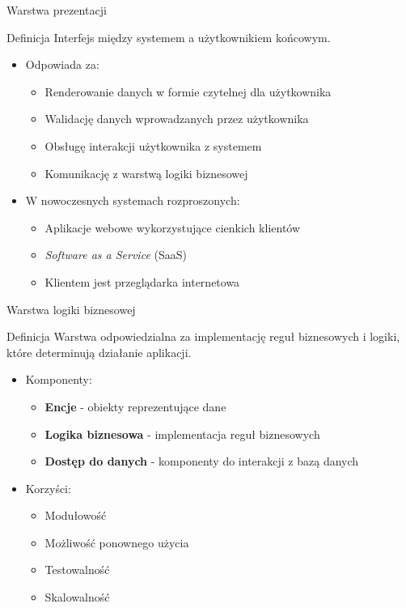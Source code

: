 \documentclass[aspectratio=169]{beamer}
\begin{document}
\begin{frame}{Warstwa prezentacji}
    \begin{block}{Definicja}
        Interfejs między systemem a użytkownikiem końcowym.
    \end{block}
    
    \begin{itemize}
        \item Odpowiada za:
        \begin{itemize}
            \item Renderowanie danych w formie czytelnej dla użytkownika
            \item Walidację danych wprowadzanych przez użytkownika
            \item Obsługę interakcji użytkownika z systemem
            \item Komunikację z warstwą logiki biznesowej
        \end{itemize}
        \vspace{0.3cm}
        \item W nowoczesnych systemach rozproszonych:
        \begin{itemize}
            \item Aplikacje webowe wykorzystujące cienkich klientów
            \item \textit{Software as a Service} (SaaS)
            \item Klientem jest przeglądarka internetowa
        \end{itemize}
    \end{itemize}
\end{frame}

\begin{frame}{Warstwa logiki biznesowej}
    \begin{block}{Definicja}
        Warstwa odpowiedzialna za implementację reguł biznesowych i logiki, które determinują działanie aplikacji.
    \end{block}
    
    \begin{itemize}
        \item Komponenty:
        \begin{itemize}
            \item \textbf{Encje} - obiekty reprezentujące dane
            \item \textbf{Logika biznesowa} - implementacja reguł biznesowych
            \item \textbf{Dostęp do danych} - komponenty do interakcji z bazą danych
        \end{itemize}
        \vspace{0.3cm}
        \item Korzyści:
        \begin{itemize}
            \item Modułowość
            \item Możliwość ponownego użycia
            \item Testowalność
            \item Skalowalność
        \end{itemize}
    \end{itemize}
\end{frame}
\end{document}
